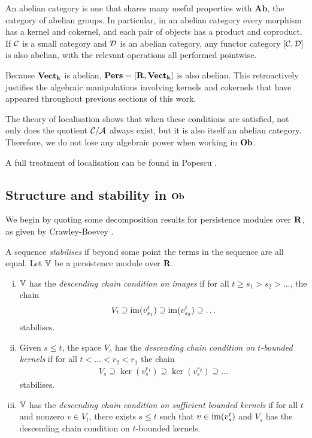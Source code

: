 An abelian category is one that shares many useful properties with $\mathbf{Ab}$, the category of abelian groups. In particular, in an abelian category every morphism has a kernel and cokernel, and each pair of objects has a product and coproduct. If $\mathcal{C}$ is a small category and $\mathcal{D}$ is an abelian category, any functor category $[\mathcal{C}, \mathcal{D}]$ is also abelian, with the relevant operations all performed pointwise.

Because $\mathbf{Vect}_{\mathbf{k}}$ is abelian, $\mathbf{Pers} = [\mathbf{R}, \mathbf{Vect}_{\mathbf{k}}]$ is also abelian. This retroactively justifies the algebraic manipulations involving kernels and cokernels that have appeared throughout previous sections of this work.

The theory of localisation shows that when these conditions are satisfied, not only does the quotient $\mathcal{C}/\mathcal{A}$ always exist, but it is also itself an abelian category. Therefore, we do not lose any algebraic power when working in $\mathbf{Ob}$.

A full treatment of localisation can be found in Popescu \cite{popescu1973abelian}.

\subsection{Structure and stability in $\mathbf{Ob}$}

We begin by quoting some decomposition results for persistence modules over $\mathbf{R}$, as given by Crawley-Boevey \cite{chazal2014observable,crawley2012decomposition}. 

\begin{definition}
A sequence \emph{stabilises} if beyond some point the terms in the sequence are all equal. Let $\mathbb{V}$ be a persistence module over $\mathbf{R}$.
\begin{enumerate}[i)]
\item $\mathbb{V}$ has the \emph{descending chain condition on images} if for all $t \geq s_1 > s_2 > \dots$, the chain
\begin{align*}
V_t \supseteq \operatorname{im}(v_{s_1}^t) \supseteq \operatorname{im}(v_{s_2}^t) \supseteq \dots
\end{align*}
stabilises.
\item Given $s \leq t$, the space $V_s$ has the \emph{descending chain condition on $t$-bounded kernels} if for all $t < \dots < r_2 < r_1$ the chain
\begin{align*}
V_s \supseteq \ker(v_s^{r_1}) \supseteq \ker(v_s^{r_2}) \supseteq \dots
\end{align*}
stabilises.
\item $\mathbb{V}$ has the \emph{descending chain condition on sufficient bounded kernels} if for all $t$ and nonzero $v \in V_t$, there exists $s \leq t$ such that $v \in \operatorname{im}(v_s^t)$ and $V_s$ has the descending chain condition on $t$-bounded kernels.
\end{enumerate}
\end{definition}

